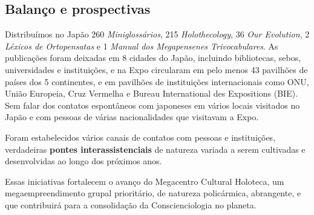 \documentclass{gescons}
\begin{document}
\subsection*{Balanço e prospectivas}


Distribuímos no Japão 260 \emph{Miniglossários}, 215 \emph{Holothecology}, 36 \emph{Our Evolution}, 2 \emph{Léxicos de Ortopensatas} e 1 \emph{Manual dos Megapensenes Trivocabulares}. As publicações foram deixadas em 8 cidades do Japão, incluindo bibliotecas, sebos, universidades e instituições, e na Expo circularam em pelo menos 43 pavilhões de países dos 5 continentes, e em pavilhões de instituições internacionais como ONU, União Europeia, Cruz Vermelha e Bureau International des Expositions (BIE). Sem falar dos contatos espontâneos com japoneses em vários locais visitados no Japão e com pessoas de várias nacionalidades que visitavam a Expo.

Foram estabelecidos vários canais de contatos com pessoas e instituições, verdadeiras \textbf{pontes interassistenciais} de natureza variada a serem cultivadas e desenvolvidas ao longo dos próximos anos.

Essas iniciativas fortalecem o avanço do Megacentro Cultural Holoteca, um megaempreendimento grupal prioritário, de natureza policármica, abrangente, e que contribuirá para a consolidação da Conscienciologia no planeta.


        
\end{document}
